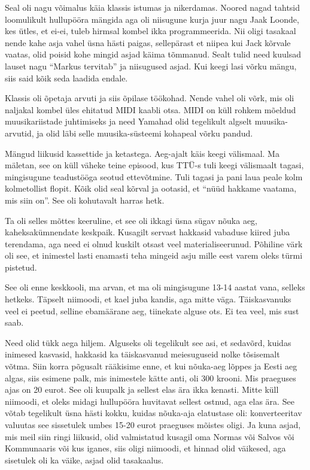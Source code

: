 Seal oli nagu võimalus käia klassis istumas ja nikerdamas. Noored nagad tahtsid 
loomulikult hullupööra mängida aga oli niisugune kurja juur nagu Jaak Loonde, 
kes ütles, et ei-ei, tuleb hirmsal kombel ikka programmeerida. Nii oligi 
tasakaal nende kahe asja vahel üsna hästi paigas, sellepärast et niipea kui 
Jack kõrvale vaatas, olid poisid kohe mingid asjad käima tõmmanud. Sealt tulid 
need kuulsad lauset nagu \enquote{Markus tervitab} ja niisugused asjad. Kui 
keegi lasi võrku mängu, siis said kõik seda laadida endale. 


Klassis oli õpetaja arvuti ja siis õpilase töökohad. Nende vahel oli võrk, mis 
oli naljakal kombel üles ehitatud MIDI kaabli otsa. MIDI on küll rohkem mõeldud 
 muusikariistade juhtimiseks ja need Yamahad olid tegelikult algselt 
muusika-arvutid, ja olid läbi selle muusika-süsteemi kohapeal võrku pandud.

Mängud liikusid kassettide ja ketastega. Aeg-ajalt käis keegi välismaal. Ma 
mäletan, see on küll väheke teine episood, kus TTÜ-s tuli keegi välismaalt 
tagasi,  mingisugune teadustööga seotud ettevõtmine. Tuli tagasi ja pani laua 
peale kolm kolmetollist flopit. Kõik olid seal kõrval ja ootasid, et 
\enquote{nüüd hakkame vaatama, mis siin on}. See oli kohutavalt harras hetk.
                 

Ta oli selles mõttes keeruline, et see oli ikkagi üsna sügav nõuka aeg, 
kaheksakümnendate keskpaik. Kusagilt servast hakkasid vabaduse kiired juba 
terendama, aga need ei olnud kuskilt otsast veel materialiseerunud. Põhiline 
värk oli see, et inimestel lasti enamasti teha mingeid asju mille eest varem 
oleks türmi pistetud.

                 
See oli enne keskkooli, ma arvan, et ma oli mingisugune 13-14 aastat vana, 
selleks hetkeks. Täpselt niimoodi, et kael juba kandis, aga mitte väga. 
Täiskasvanuks  veel ei peetud, selline ebamäärane aeg, tiinekate alguse ots. Ei 
tea veel, mis sust saab.


Need olid  tükk aega hiljem. Alguseks oli tegelikult see asi, et sedavõrd, 
kuidas inimesed kasvasid, hakkasid ka täiskasvanud  meiesuguseid nolke 
tõsisemalt võtma. Siin korra põgusalt rääkisime enne, et kui nõuka-aeg lõppes 
ja Eesti aeg algas, siis esimene palk, mis inimestele kätte anti, oli 300 
krooni. Mis praeguses ajas on 20 eurot. See oli kuupalk ja sellest elas ära 
ikka kenasti. Mitte küll niimoodi, et oleks midagi hullupööra huvitavat sellest 
ostnud, aga elas ära. See võtab tegelikult üsna hästi kokku, kuidas nõuka-aja 
elatustase oli: konverteeritav valuutas see sissetulek umbes 15-20 eurot 
praeguses mõistes oligi. Ja kuna asjad, mis meil siin ringi liikusid, olid 
valmistatud kusagil oma Normas või Salvos või Kommunaaris või kus iganes,  siis 
 oligi niimoodi,  et hinnad olid väikesed, aga sisetulek oli ka väike, asjad 
olid tasakaalus. 

